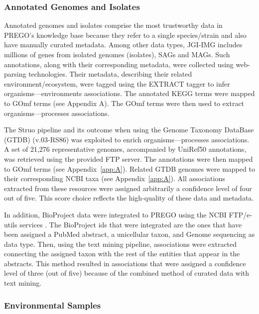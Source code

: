    \subsubsection*{Annotated Genomes and Isolates}
   \label{subsec:prego-isolates}

   Annotated genomes and isolates comprise the most trustworthy data in PREGO's knowledge base because they refer to a single species/strain and also have manually curated metadata. 
   Among other data types, JGI-IMG \citep{chen2021img, mukherjee2021genomes} includes millions of genes from isolated genomes (isolates), SAGs and MAGs. Such annotations, along with their corresponding metadata, were collected using web-parsing technologies. Their metadata, describing their related environment/ecosystem, were tagged using the EXTRACT tagger to infer organisms—environments associations. The annotated KEGG terms were mapped to GOmf terms (see Appendix A). The GOmf terms were then used to extract organisms—processes associations.
   
   The Struo pipeline \citep{de2020struo} and its outcome when using the Genome Taxonomy DataBase (GTDB) (v.03-RS86) \citep{parks2020complete} was exploited to enrich organisms—processes associations. 
   A set of 21,276 representative genomes, accompanied by UniRef50 annotations, was retrieved using the provided FTP server. The annotations were then mapped to GOmf terms (see Appendix~\ref{app:A}). 
   Related GTDB genomes were mapped to their corresponding NCBI taxa (see Appendix~\ref{app:A}). 
   All associations extracted from these resources were assigned arbitrarily a confidence level of four out of five. 
   This score choice reflects the high-quality of these data and metadata.
   
   In addition, BioProject data were integrated to PREGO using the NCBI FTP/e-utils services \citep{sayers2021database}. 
   The BioProject ids that were integrated are the ones that have been assigned a PubMed abstract, a unicellular taxon, and Genome sequencing as data type. Then, using the text mining pipeline, associations were extracted connecting the assigned taxon with the rest of the entities that appear in the abstracts. This method resulted in associations that were assigned a confidence level of three (out of five) because of the combined method of curated data with text mining.


   \subsubsection*{Environmental Samples}
   \label{subsec:prego-envsamples}

